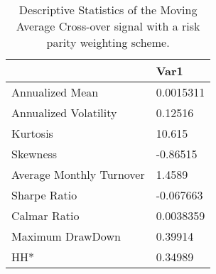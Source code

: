 \begin{table}[H]
\centering
\begin{tabular}{ll}
\hline& Var1 \\ 
\hline 
Annualized Mean & 0.0015311 \\ 
Annualized Volatility & 0.12516 \\ 
Kurtosis & 10.615 \\ 
Skewness & -0.86515 \\ 
Average Monthly Turnover & 1.4589 \\ 
Sharpe Ratio & -0.067663 \\ 
Calmar Ratio & 0.0038359 \\ 
Maximum DrawDown & 0.39914 \\ 
HH* & 0.34989 \\ 
\hline
\end{tabular}
\caption{Descriptive Statistics of the Moving Average Cross-over signal with a risk parity weighting scheme.}
\label{MARP}
\end{table}